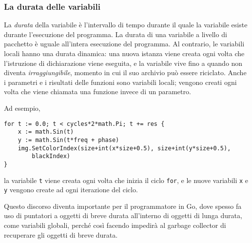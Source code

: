 \documentclass[../../../thesis.tex]{subfiles}
\begin{document}
    \subsubsection{La durata delle variabili}
    La \textit{durata} della variabile è l'intervallo di tempo durante il quale la variabile esiste durante l'esecuzione del programma.
    La durata di una variabile a livello di pacchetto è uguale all'intera esecuzione del programma.
    Al contrario, le variabili locali hanno una durata dinamica: una nuova istanza viene creata ogni volta che l'istruzione di dichiarazione viene eseguita, e la variabile vive fino a quando non diventa \textit{irraggiungibile}, momento in cui il suo archivio può essere riciclato.
    Anche i parametri e i risultati delle funzioni sono variabili locali;
    vengono creati ogni volta che viene chiamata una funzione invece di un parametro.
    \hfill \vspace{12pt}

    Ad esempio,
    \begin{lstlisting}[frame = single,label={lst:lstlisting1-3-4.1}]
for t := 0.0; t < cycles*2*math.Pi; t += res {
    x := math.Sin(t)
    y := math.Sin(t*freq + phase)
    img.SetColorIndex(size+int(x*size+0.5), size+int(y*size+0.5),
        blackIndex)
}
    \end{lstlisting}
    la variabile \verb"t" viene creata ogni volta che inizia il ciclo \verb"for", e le nuove variabili \verb"x" e \verb"y" vengono create ad ogni iterazione del ciclo.
    \hfill \vspace{12pt}

    Questo discorso diventa importante per il programmatore in Go, dove spesso fa uso di puntatori a oggetti di breve durata all'interno di oggetti di lunga durata, come variabili globali, perché così facendo impedirà al garbage collector di recuperare gli oggetti di breve durata.
\end{document}

